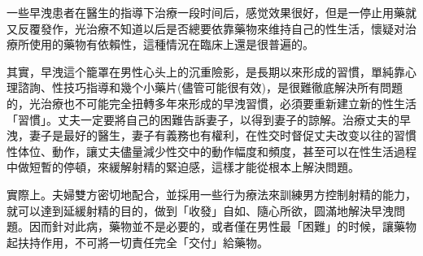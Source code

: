 \documentclass[12pt,UTF8]{ctexbook}
\begin{document}
一些早洩患者在醫生的指導下治療一段时间后，感觉效果很好，但是一停止用藥就又反覆發作，光治療不知道以后是否總要依靠藥物來维持自己的性生活，懷疑对治療所使用的藥物有依賴性，這種情況在臨床上還是很普遍的。

其實，早洩這个籠罩在男性心头上的沉重險影，是長期以來形成的習慣，單純靠心理諮詢、性技巧指導和幾个小藥片(儘管可能很有效)，是很難徹底解決所有問題的，光治療也不可能完全扭轉多年來形成的早洩習慣，必須要重新建立新的性生活「習慣」。丈夫一定要將自己的困難告訴妻子，以得到妻子的諒解。治療丈夫的早洩，妻子是最好的醫生，妻子有義務也有權利，在性交时督促丈夫改变以往的習慣性体位、動作，讓丈夫儘量減少性交中的動作幅度和頻度，甚至可以在性生活過程中做短暫的停頓，來緩解射精的緊迫感，這樣才能從根本上解決問題。

實際上。夫婦雙方密切地配合，並採用一些行为療法來訓練男方控制射精的能力，就可以達到延緩射精的目的，做到「收發」自如、隨心所欲，圆滿地解決早洩問題。因而針对此病，藥物並不是必要的，或者僅在男性最「困難」的时候，讓藥物起扶持作用，不可將一切責任完全「交付」給藥物。

\backmatter
\end{document}

